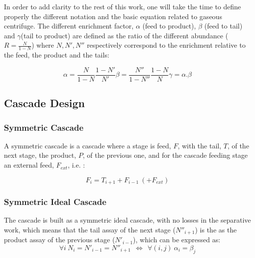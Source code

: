 In order to add clarity to the rest of this work, one will take the time to
define properly the different notation and the basic equation related to gaseous
centrifuge. The different enrichment factor, $\alpha$ (feed to product), $\beta$
(feed to tail) and $\gamma$(tail to product) are defined as the ratio of the
different abundance ($R = \frac{N}{1-N}$) where $N, N', N''$ respectively
correspond to the enrichment relative to the feed, the product and the tails:

\begin{subequations}
    \label{eq_alphabeta}
    \begin{equation} \label{eq_alpha_def}
        \alpha = \frac{N}{1-N}\frac{1-N'}{N'}
    \end{equation}
    \begin{equation}\label{eq_beta-def}
        \beta = \frac{N''}{1-N''}\frac{1-N}{N}
    \end{equation}
    \begin{equation}\label{eq_gamma-def}
        \gamma = \alpha.\beta
    \end{equation}
\end{subequations}


\subsection{Cascade Design}
\subsubsection{Symmetric Cascade}

A symmetric cascade is a cascade where a stage is feed, $F$, with the tail, $T$, of the next
stage, the product, $P$, of the previous one, and for the cascade feeding stage
an external feed, $F_{ext}$, i.e. :

\begin{equation}
    F_{i} = T_{i+1} + F_{i-1} ~(+ F_{ext})
\end{equation}

\subsubsection{Symmetric Ideal Cascade}
The cascade is built as a symmetric ideal cascade, with no losses in the
separative work, which means that the tail assay of the next stage ($N''_{i+1}$)
is the as the product assay of the previous stage ($N'_{i-1}$), which can be
expressed as:
\begin{equation}
    \forall i~ N_{i} = N'_{i-1} = N''_{i+1}~ ~\Leftrightarrow~ ~\forall (i,j)~
    \alpha_{i} = \beta_{j}
\end{equation}




